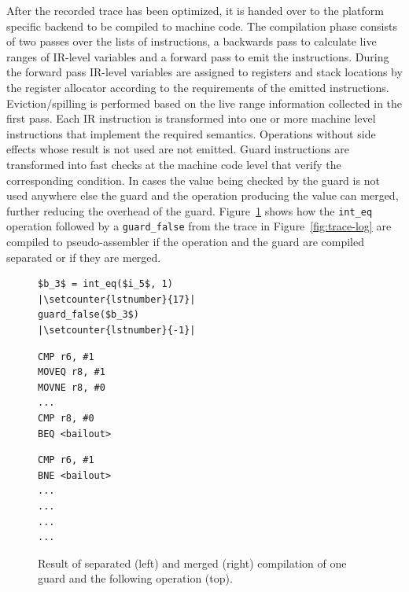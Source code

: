 \documentclass[10pt,preprint]{sigplanconf}
\let\oldlstinline=\lstinline
\renewcommand\lstinline[1]{\oldlstinline[basicstyle=\ttfamily]{#1}}
\begin{document}
After the recorded trace has been optimized, it is handed over to the platform specific
backend to be compiled to machine code. The compilation phase consists of two
passes over the lists of instructions, a backwards pass to calculate live
ranges of IR-level variables and a forward pass to emit the instructions. During
the forward pass IR-level variables are assigned to registers and stack
locations by the register allocator according to the requirements of the
emitted instructions.  Eviction/spilling is performed based on the live range
information collected in the first pass. Each IR instruction is transformed
into one or more machine level instructions that implement the required
semantics. Operations without side effects whose result is not used are not
emitted. Guard instructions are transformed into fast checks at the machine
code level that verify the corresponding condition.  In cases the value being
checked by the guard is not used anywhere else the guard and the operation
producing the value can merged, further reducing the overhead of the guard.
Figure~\ref{fig:trace-compiled} shows how the \lstinline{int_eq} operation
followed by a \lstinline{guard_false} from the trace in Figure~\ref{fig:trace-log} are compiled to
pseudo-assembler if the operation and the guard are compiled separated or if
they are merged.

\begin{figure}[ht]
  \noindent
  \centering
  \begin{minipage}{1\columnwidth}
\begin{lstlisting}[xleftmargin=20pt,xrightmargin=20pt,framexleftmargin=5pt,framexrightmargin=-10pt,mathescape, numbers=right, escapechar=|, firstnumber=18,frame=b]
$b_3$ = int_eq($i_5$, 1)                    |\setcounter{lstnumber}{17}|
guard_false($b_3$)                          |\setcounter{lstnumber}{-1}|
\end{lstlisting}
  \end{minipage}
  \begin{minipage}{.40\columnwidth}
    \begin{lstlisting}
CMP r6, #1
MOVEQ r8, #1
MOVNE r8, #0
...
CMP r8, #0
BEQ <bailout>
    \end{lstlisting}
  \end{minipage}
  \hfill
  \begin{minipage}{.40\columnwidth}
    \begin{lstlisting}
CMP r6, #1
BNE <bailout>
...
...
...
...
    \end{lstlisting}
  \end{minipage}
  \caption{Result of separated (left) and merged (right) compilation of one guard and the following operation (top).}
  \label{fig:trace-compiled}
\end{figure}
\end{document}
